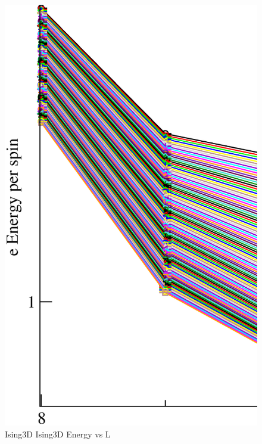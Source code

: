 \begin{figure}[!htpb]
  \centering
  \includegraphics[width=\textwidth]{./plots/Ising3D/Ising3D_Energy_vs_L.eps}
  \caption{Ising3D Ising3D Energy vs L}
\end{figure}

